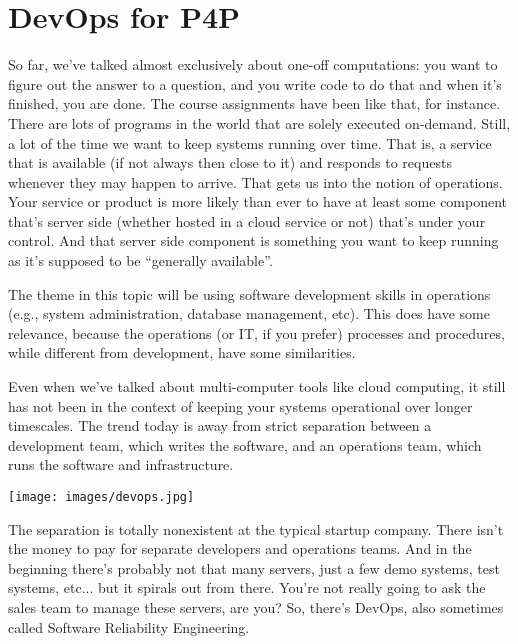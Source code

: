 




\section*{DevOps for P4P}
So far, we've talked almost exclusively about one-off computations:
you want to figure out the answer to a question, and you write code to
do that and when it's finished, you are done. 
The course assignments have been like that, for instance. There are lots
of programs in the world that are solely executed on-demand. Still, a lot
of the time we want to keep systems running over time. That is, a service
that is available (if not always then close to it) and responds to requests
whenever they may happen to arrive. That gets us
into the notion of operations. Your service or product is more likely than 
ever to have at least some component that's server side (whether hosted
in a cloud service or not) that's under your control. And that server side
component is something you want to keep running as it's supposed to be 
``generally available''.

The theme in this topic will be using software development skills in
operations (e.g., system administration, database management, etc). This
does have some relevance, because the operations (or IT, if you prefer)
processes and procedures, while different from development, have some
similarities. 

Even when we've talked about multi-computer tools like cloud
computing, it still has not been in the context of keeping your
systems operational over longer timescales. The trend today is away
from strict separation between a development team, which writes the
software, and an operations team, which runs the software and infrastructure.

\begin{center}
	\texttt{[image: images/devops.jpg]}
\end{center}

The separation is totally nonexistent at the typical startup company. There isn't the money to pay for separate developers and operations teams. And in the beginning there's probably not that many servers, just a few demo systems, test systems, etc... but it spirals out from there. You're not really going to ask the sales team to manage these servers, are you? So, there's DevOps, also sometimes called Software Reliability Engineering.

